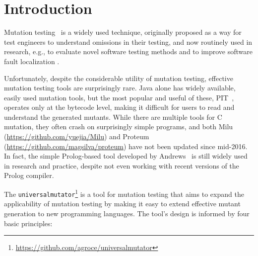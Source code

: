 \section{Introduction}

Mutation testing~\cite{PracProg,Mut2000} is a widely used technique,
originally proposed as a way for test engineers to understand
omissions in their testing, and now routinely used in research, e.g., to evaluate
novel software testing methods \cite{ISSTA13,ahmed_testedness,AlipourETAL2016ASE} and to improve software
fault localization \cite{Metallaxis,multilingual,TransProgTest}.

Unfortunately, despite the considerable utility of mutation testing,
effective mutation testing tools are surprisingly rare.  Java alone
has widely available, easily used mutation tools, but the most popular
and useful of these, PIT~\cite{pittest}, operates only at the bytecode
level, making it difficult for users to read and understand the
generated mutants.  While there are multiple tools for C mutation,
they often crash on surprisingly simple programs, and both Milu
(\url{https://github.com/yuejia/Milu}) and Proteum
(\url{https://github.com/magsilva/proteum}) have not been updated
since mid-2016.  In fact, the simple Prolog-based tool developed by
Andrews~\cite{mutant} is still widely used in research and
practice, despite not even working with recent versions of the Prolog compiler.

The {\tt universalmutator}\footnote{\url{https://github.com/agroce/universalmutator}} is a tool for
mutation testing that aims to expand the
applicability of mutation testing by making it easy to extend
effective mutant generation to new programming languages.
The tool's design is informed by four basic principles:

